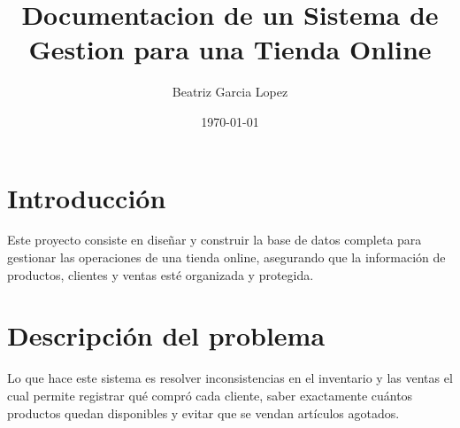 \documentclass[10pt,letterpaper]{article}
\title{Documentacion de un Sistema de Gestion para una Tienda Online}
\author{Beatriz Garcia Lopez }
\date{\today}
\begin{document}
\maketitle




\section{Introducción}
Este proyecto consiste en diseñar y construir la base de datos completa para gestionar las operaciones de una tienda online,
 asegurando que la información de productos, clientes y ventas esté organizada y protegida.
\section{Descripción del problema}
Lo que hace este sistema es resolver inconsistencias en el inventario y las ventas el cual
 permite registrar qué compró cada cliente, saber exactamente cuántos productos 
 quedan disponibles y evitar que se vendan artículos agotados.
\end{document}
